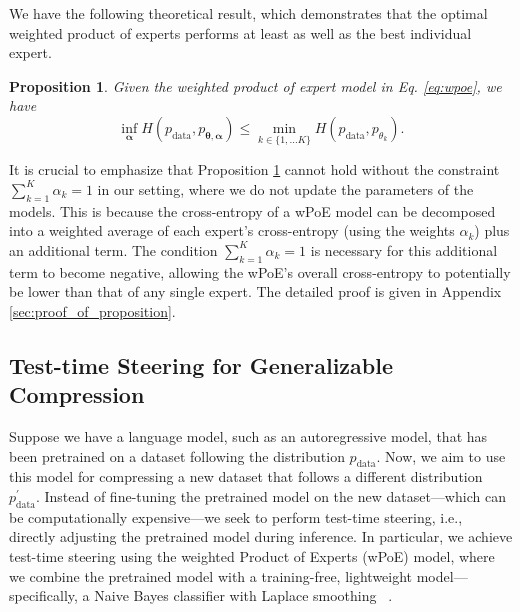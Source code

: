 \documentclass[11pt]{article}
\newtheorem{proposition}{Proposition}
\begin{document}
We have the following theoretical result, which demonstrates that the optimal weighted product of experts performs at least as well as the best individual expert.
\begin{proposition}
\label{prop:wPoe_ensures_a_better_model}
Given the weighted product of expert model in Eq. \eqref{eq:wpoe}, we have 
\begin{equation*}
    \displaystyle\inf_{\boldsymbol{\alpha}}H(p_{\text{data}},p_{\boldsymbol{\theta}, \boldsymbol{\alpha}} ) \leq \displaystyle\min_{k \in \{1,...K\}} H(p_{\text{data}}, p_{\theta_k}).
\end{equation*}
\end{proposition}

It is crucial to emphasize that Proposition \ref{prop:wPoe_ensures_a_better_model} cannot hold without the constraint $\sum_{k = 1}^K \alpha_k = 1$ in our setting, where we do not update the parameters of the models. This is because the cross-entropy of a wPoE model can be decomposed into a weighted average of each expert’s cross-entropy (using the weights \(\alpha_k\)) plus an additional term. The condition \(\sum_{k=1}^K \alpha_k = 1\) is necessary for this additional term to become negative, allowing the wPoE’s overall cross-entropy to potentially be lower than that of any single expert. The detailed proof is given in Appendix \ref{sec:proof_of_proposition}. 

\subsection{Test-time Steering for Generalizable Compression}\label{subsect:test_time_steering}

Suppose we have a language model, such as an autoregressive model, that has been pretrained on a dataset following the distribution $p_{\text{data}}$.
Now, we aim to use this model for compressing a new dataset that follows a different distribution $p_{\text{data}}^{\prime}$.
Instead of fine-tuning the pretrained model on the new dataset—which can be computationally expensive—we seek to perform test-time steering, i.e., directly adjusting the pretrained model during inference.
In particular, we achieve test-time steering using the weighted Product of Experts (wPoE) model, where we combine the pretrained model with a training-free, lightweight model—specifically, a Naive Bayes classifier with Laplace smoothing ~\citep{naive_bayes}.
\end{document}
